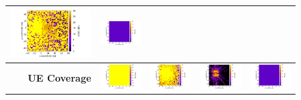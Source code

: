 \documentclass[10pt,a4]{article}
\begin{document}
\begin{figure}[h!]
{\begin{tabular}{r|cccc}
    \includegraphics[width=0.25\linewidth]{../kpm-plots/nr-rem-DL_COVERAGE_AREA-sinr.pdf} &
    \includegraphics[width=0.25\linewidth]{../kpm-plots/nr-rem-DL_COVERAGE_AREA-sir.pdf} \\
    \hline
    \textbf{UE Coverage} &
    \includegraphics[width=0.25\linewidth]{../kpm-plots/nr-rem-DL_UE_COVERAGE-ipsd.pdf} &
    \includegraphics[width=0.25\linewidth]{../kpm-plots/nr-rem-DL_UE_COVERAGE-snr.pdf} &
    \includegraphics[width=0.25\linewidth]{../kpm-plots/nr-rem-DL_UE_COVERAGE-sinr.pdf} &
    \includegraphics[width=0.25\linewidth]{../kpm-plots/nr-rem-DL_UE_COVERAGE-sir.pdf} \\
    \end{tabular}}
    \end{figure}
\end{document}
